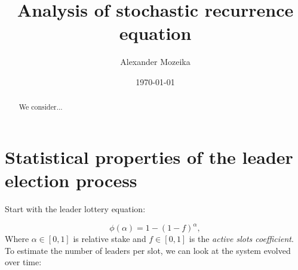 \documentclass[10pt]{iopart}
\newcommand{\1}{\mathbf{1}}
\begin{document}
\title[Stochastic recurrence equation]{Analysis of stochastic recurrence equation}
%


\author{Alexander Mozeika}
\address{$^1$Status.im}






\date{\today}


\begin{abstract}
We consider...  
\end{abstract}

\tableofcontents

\newpage


\section{Statistical properties of the leader election process \label{section:election-process}}
Start with the leader lottery equation:

\begin{equation}
\phi(\alpha)=1-(1-f)^\alpha,
\end{equation}
Where $\alpha\in[0,1]$ is relative stake and $f\in[0,1]$ is the \emph{active slots coefficient}.
To estimate the number of leaders per slot, we can look at the system evolved over time:

\end{document}
